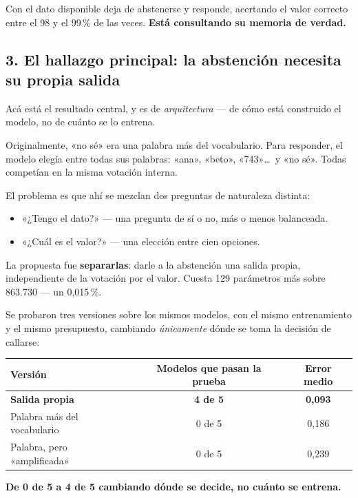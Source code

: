 \documentclass[11pt,a4paper]{article}
\begin{document}
Con el dato disponible deja de abstenerse y responde, acertando el valor correcto entre el 98 y
el 99\,\% de las veces. \textbf{Está consultando su memoria de verdad.}

\subsection{3. El hallazgo principal: la abstención necesita su propia salida}

Acá está el resultado central, y es de \emph{arquitectura} --- de cómo está construido el modelo,
no de cuánto se lo entrena.

Originalmente, «no sé» era una palabra más del vocabulario. Para responder, el modelo elegía
entre todas sus palabras: «ana», «beto», «743»\ldots\ y «no sé». Todas competían en la misma
votación interna.

El problema es que ahí se mezclan dos preguntas de naturaleza distinta:

\begin{itemize}
  \item «¿Tengo el dato?» --- una pregunta de sí o no, más o menos balanceada.
  \item «¿Cuál es el valor?» --- una elección entre cien opciones.
\end{itemize}

La propuesta fue \textbf{separarlas}: darle a la abstención una salida propia, independiente de
la votación por el valor. Cuesta 129 parámetros más sobre 863.730 --- un 0,015\,\%.

Se probaron tres versiones sobre los mismos modelos, con el mismo entrenamiento y el mismo
presupuesto, cambiando \emph{únicamente} dónde se toma la decisión de callarse:

\begin{center}
\begin{tabular}{lcc}
\toprule
\textbf{Versión} & \textbf{Modelos que pasan la prueba} & \textbf{Error medio} \\
\midrule
\textcolor{verde}{\textbf{Salida propia}} & \textcolor{verde}{\textbf{4 de 5}} & \textcolor{verde}{\textbf{0,093}} \\
Palabra más del vocabulario & 0 de 5 & 0,186 \\
Palabra, pero «amplificada» & 0 de 5 & 0,239 \\
\bottomrule
\end{tabular}
\end{center}

\textbf{De 0 de 5 a 4 de 5 cambiando dónde se decide, no cuánto se entrena.}
\end{document}
